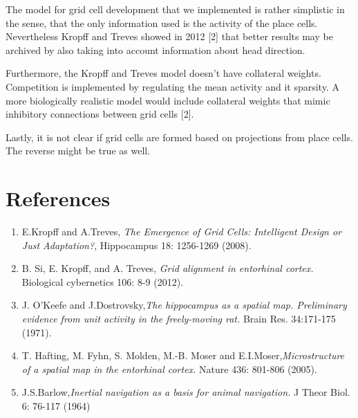 \documentclass[a4paper, 12pt]{article}
\begin{document}

The model for grid cell development that we implemented is rather simplistic in the sense, that the only information used is the activity of the place cells. Nevertheless Kropff and Treves showed in 2012 [2] that better results may be archived by also taking into account information about head direction. 

Furthermore, the Kropff and Treves model doesn't have collateral weights. Competition is implemented by regulating the mean activity and it sparsity. A more biologically realistic model would include collateral weights that mimic inhibitory connections between grid cells [2]. 

Lastly, it is not clear if grid cells are formed based on projections from place cells. The reverse might be true as well.

\newpage
\section{References}
\begin{enumerate}
\item E.Kropff and A.Treves, \textit{The Emergence of Grid Cells: Intelligent Design or Just Adaptation?}, Hippocampus 18: 1256-1269 (2008).

\item B. Si, E. Kropff, and A. Treves, \textit{Grid alignment in entorhinal cortex.} Biological cybernetics 106: 8-9 (2012).

\item J. O'Keefe and J.Dostrovsky,\textit{The hippocampus as a spatial map. Preliminary evidence from unit activity in the freely-moving rat.} Brain Res. 34:171-175 (1971). 

\item T. Hafting, M. Fyhn, S. Molden, M.-B. Moser and E.I.Moser,\textit{Microstructure of a spatial map in the entorhinal cortex.} Nature 436: 801-806 (2005).

\item J.S.Barlow,\textit{Inertial navigation as a basis for animal navigation.} J Theor Biol. 6:  76-117 (1964)
\end{enumerate}
\end{document}
